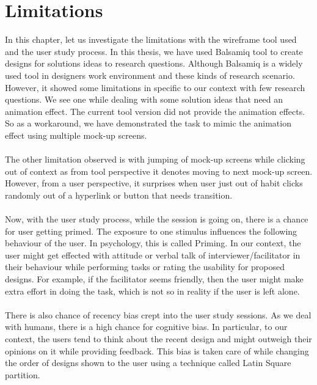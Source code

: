 \chapter{Limitations}
\label{ch:limitations_report}

In this chapter, let us investigate the limitations with the wireframe tool used and the user study process. In this thesis, we have used Balsamiq tool to create designs for solutions ideas to research questions. Although Balsamiq is a widely used tool in designers work environment and these kinds of research scenario. However, it showed some limitations in specific to our context with few research questions. We see one while dealing with some solution ideas that need an animation effect. The current tool version did not provide the animation effects. So as a workaround, we have demonstrated the task to mimic the animation effect using multiple mock-up screens. \\ \\

The other limitation observed is with jumping of mock-up screens while clicking out of context as from tool perspective it denotes moving to next mock-up screen. However, from a user perspective, it surprises when user just out of habit clicks randomly out of a hyperlink or button that needs transition. \\ \\

Now, with the user study process, while the session is going on, there is a chance for user getting primed. The exposure to one stimulus influences the following behaviour of the user. In psychology, this is called Priming. \cite{priming} In our context, the user might get effected with attitude or verbal talk of interviewer/facilitator in their behaviour while performing tasks or rating the usability for proposed designs. For example, if the facilitator seems friendly, then the user might make extra effort in doing the task, which is not so in reality if the user is left alone. \\ \\

There is also chance of recency bias crept into the user study sessions. As we deal with humans, there is a high chance for cognitive bias. In particular, to our context, the users tend to think about the recent design and might outweigh their opinions on it while providing feedback. This bias is taken care of while changing the order of designs shown to the user using a technique called Latin Square partition. \cite{lsp} \\ \\

